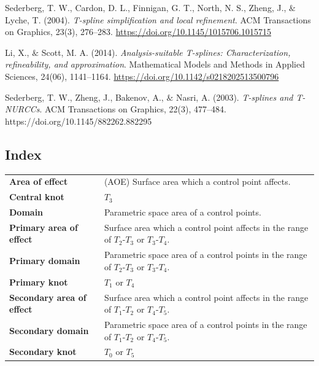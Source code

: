 \documentclass{article}
\begin{document}
\vspace{12pt}

Sederberg, T. W., Cardon, D. L., Finnigan, G. T., North, N. S., Zheng, J., $\&$ Lyche, T. (2004). \emph{T-spline simplification and local refinement}. ACM Transactions on Graphics, 23(3), 276–283. \url{https://doi.org/10.1145/1015706.1015715}

\vspace{12pt}

Li, X., $\&$ Scott, M. A. (2014). \emph{Analysis-suitable T-splines: Characterization, refineability, and approximation}. Mathematical Models and Methods in Applied Sciences, 24(06), 1141–1164. \url{https://doi.org/10.1142/s0218202513500796}

\vspace{12pt}

Sederberg, T. W., Zheng, J., Bakenov, A., $\&$ Nasri, A. (2003). \emph{T-splines and T-NURCCs}. ACM Transactions on Graphics, 22(3), 477–484. https://doi.org/10.1145/882262.882295

\vspace{12pt}

\vspace{12pt}

\begin{large}
\section{Index}
\end{large}

\vspace{12pt}

\begin{table}[H]
\centering
\begin{tabular}{L{4cm} L{10cm}}
\hline
\textbf{Area of effect} & (AOE) Surface area which a control point affects.  \\
\textbf{Central knot} & $T_3$  \\
\textbf{Domain} & Parametric space area of a control points.  \\
\textbf{Primary area of effect} & Surface area which a control point affects in the range of $T_2$-$T_3$ or $T_3$-$T_4$.  \\
\textbf{Primary domain} & Parametric space area of a control points in the range of $T_2$-$T_3$ or $T_3$-$T_4$.  \\
\textbf{Primary knot} & $T_1$ or $T_4$  \\
\textbf{Secondary area of effect} & Surface area which a control point affects in the range of $T_1$-$T_2$ or $T_4$-$T_5$.  \\
\textbf{Secondary domain} & Parametric space area of a control points in the range of $T_1$-$T_2$ or $T_4$-$T_5$.  \\
\textbf{Secondary knot} & $T_0$ or $T_5$  \\
\hline
\end{tabular}
\end{table}











\newpage
\end{document}
